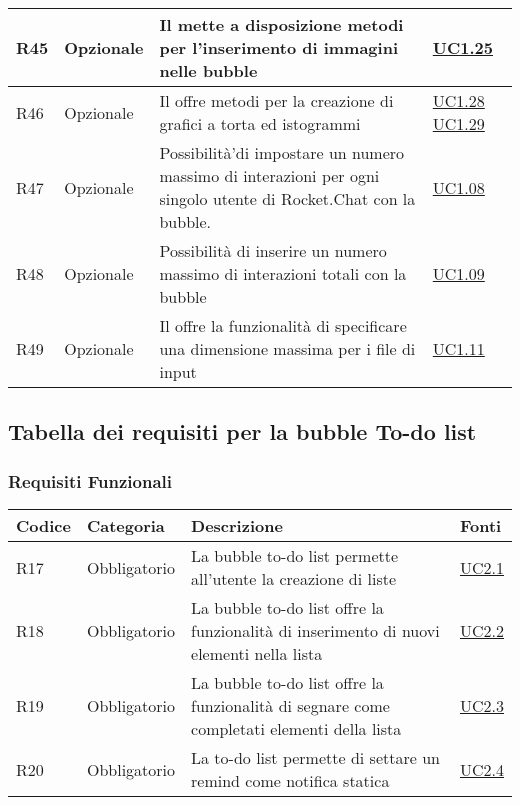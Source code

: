 \begin{longtable}{|P{1.5cm}|P{3cm}|P{6cm}|P{2.5cm}|}
	\hline R45 & Opzionale & Il  mette a disposizione metodi per l’inserimento di immagini nelle bubble
	 & \hyperref[UC1.25]{UC1.25} \\
	\hline R46 & Opzionale & Il  offre metodi per la creazione di grafici a torta ed istogrammi
	 & \hyperref[UC1.28]{UC1.28} \linebreak \hyperref[UC1.29]{UC1.29}  \\	 
	 \hline R47 & Opzionale & Possibilità'di impostare un numero massimo di interazioni per ogni singolo utente di Rocket.Chat con la bubble. & \hyperref[UC1.08]{UC1.08} \\
	 \hline R48 & Opzionale & Possibilità di inserire un numero massimo di interazioni totali con la bubble & \hyperref[UC1.09]{UC1.09} \\
	 \hline R49 & Opzionale & Il  offre la funzionalità di specificare una dimensione massima per i file di input & \hyperref[UC1.11]{UC1.11} \\
	\hline
\end{longtable}


\subsection{Tabella dei requisiti per la bubble To-do list}

\subsubsection{Requisiti Funzionali}

\begin{longtable}{|P{1.5cm}|P{3cm}|P{6cm}|P{2.5cm}|}
	\hline \textbf{Codice} & \textbf{Categoria} & \textbf{Descrizione} & \textbf{Fonti} \\
	\hline R17 & Obbligatorio & La bubble to-do list permette all’utente la creazione di liste & \hyperref[UC2.1]{UC2.1} \\
	\hline R18 & Obbligatorio & La bubble to-do list offre la funzionalità di inserimento di nuovi elementi nella lista & \hyperref[UC2.2]{UC2.2} \\
	\hline R19 & Obbligatorio & La bubble to-do list offre la funzionalità di segnare come completati elementi della lista & \hyperref[UC2.3]{UC2.3} \\
	\hline R20 & Obbligatorio & La to-do list permette di settare un  remind come notifica statica & \hyperref[UC2.4]{UC2.4} \\
	\hline
\end{longtable}

